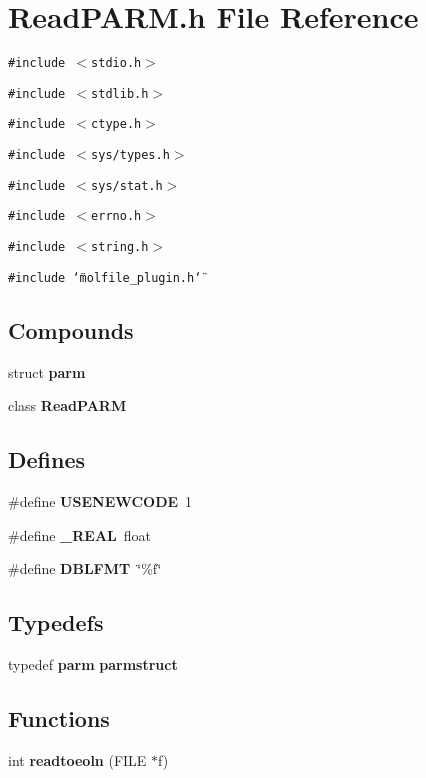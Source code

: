 \section{Read\-PARM.h File Reference}
\label{ReadPARM_8h}
{\tt \#include $<$stdio.h$>$}\par
{\tt \#include $<$stdlib.h$>$}\par
{\tt \#include $<$ctype.h$>$}\par
{\tt \#include $<$sys/types.h$>$}\par
{\tt \#include $<$sys/stat.h$>$}\par
{\tt \#include $<$errno.h$>$}\par
{\tt \#include $<$string.h$>$}\par
{\tt \#include \char`\"{}molfile\_\-plugin.h\char`\"{}}\par
\subsection*{Compounds}
\begin{CompactItemize}
\item 
struct {\bf parm}
\item 
class {\bf Read\-PARM}
\end{CompactItemize}
\subsection*{Defines}
\begin{CompactItemize}
\item 
\#define {\bf USENEWCODE}\ 1
\item 
\#define {\bf \_\-REAL}\ float
\item 
\#define {\bf DBLFMT}\ \char`\"{}\%f\char`\"{}
\end{CompactItemize}
\subsection*{Typedefs}
\begin{CompactItemize}
\item 
typedef {\bf parm} {\bf parmstruct}
\end{CompactItemize}
\subsection*{Functions}
\begin{CompactItemize}
\item 
int {\bf readtoeoln} (FILE $\ast$f)
\end{CompactItemize}



